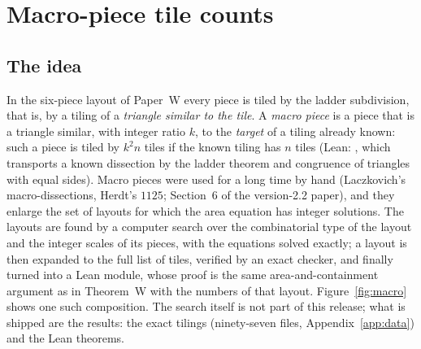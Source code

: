 \documentclass[11pt,reqno]{amsart}
\theoremstyle{plain}
\theoremstyle{definition}
\begin{document}
\section{Macro-piece tile counts}\label{sec:macro}

\subsection{The idea}
In the six-piece layout of Paper~W every piece is tiled by the ladder subdivision, that is, by a tiling of a \emph{triangle similar to the tile}.
A \emph{macro piece} is a piece that is a triangle similar, with integer ratio $k$, to the \emph{target} of a tiling already known: such a piece is tiled by $k^2n$ tiles if the known tiling has $n$ tiles (Lean: , which transports a known dissection by the ladder theorem and congruence of triangles with equal sides).
Macro pieces were used for a long time by hand (Laczkovich's macro-dissections, Herdt's $1125$; Section~6 of the version-2.2 paper), and they enlarge the set of layouts for which the area equation has integer solutions.
The layouts are found by a computer search over the combinatorial type of the layout and the integer scales of its pieces, with the equations solved exactly; a layout is then expanded to the full list of tiles, verified by an exact checker, and finally turned into a Lean module, whose proof is the same area-and-containment argument as in Theorem~W with the numbers of that layout.
Figure~\ref{fig:macro} shows one such composition. The search itself is not part of this release; what is shipped are the results: the exact tilings (ninety-seven files, Appendix~\ref{app:data}) and the Lean theorems.
\end{document}
